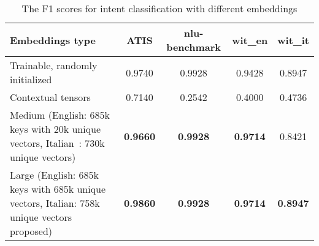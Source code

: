 
\begin{table}
	\begin{tabularx}{\textwidth}{Lcccc}
		\toprule
		\textbf{Embeddings type} & \textbf{ATIS} & \textbf{nlu-benchmark} & \textbf{wit\_en} & \textbf{wit\_it} \\
		\midrule
		Trainable, randomly initialized & 0.9740 & 0.9928 & 0.9428 & 0.8947 \\
		\midrule
		Contextual tensors & 0.7140 & 0.2542 & 0.4000 & 0.4736 \\
		\midrule
		Medium (English: 685k keys with 20k unique vectors, Italian~\cite{berardi2015word}: 730k unique vectors) & \textbf{0.9660} & \textbf{0.9928} &\textbf{0.9714} & 0.8421 \\
		\midrule
		Large (English: 685k keys with 685k unique vectors, Italian: 758k unique vectors proposed) & \textbf{0.9860} & \textbf{0.9928} & \textbf{0.9714} & \textbf{0.8947} \\
		\bottomrule
	\end{tabularx}
	\caption{The F1 scores for intent classification with different embeddings}\label{tab:intentsEmbeddingsChoice}
\end{table}
